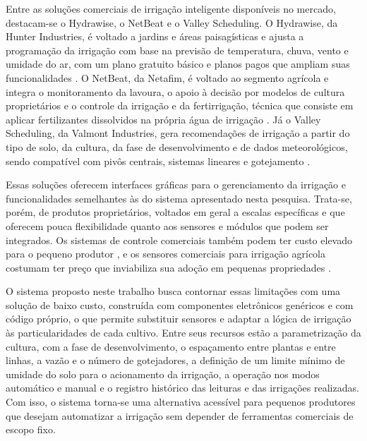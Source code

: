 Entre as soluções comerciais de irrigação inteligente disponíveis no mercado, destacam-se o Hydrawise, o NetBeat e o Valley Scheduling. O Hydrawise, da Hunter Industries, é voltado a jardins e áreas paisagísticas e ajusta a programação da irrigação com base na previsão de temperatura, chuva, vento e umidade do ar, com um plano gratuito básico e planos pagos que ampliam suas funcionalidades \cite{hunterhydrawise}. O NetBeat, da Netafim, é voltado ao segmento agrícola e integra o monitoramento da lavoura, o apoio à decisão por modelos de cultura proprietários e o controle da irrigação e da fertirrigação, técnica que consiste em aplicar fertilizantes dissolvidos na própria água de irrigação \cite{israelagri2018netbeat}. Já o Valley Scheduling, da Valmont Industries, gera recomendações de irrigação a partir do tipo de solo, da cultura, da fase de desenvolvimento e de dados meteorológicos, sendo compatível com pivôs centrais, sistemas lineares e gotejamento \cite{valmont2018,valleyscheduling}.

Essas soluções oferecem interfaces gráficas para o gerenciamento da irrigação e funcionalidades semelhantes às do sistema apresentado nesta pesquisa. Trata-se, porém, de produtos proprietários, voltados em geral a escalas específicas e que oferecem pouca flexibilidade quanto aos sensores e módulos que podem ser integrados. Os sistemas de controle comerciais também podem ter custo elevado para o pequeno produtor \cite{campos2021}, e os sensores comerciais para irrigação agrícola costumam ter preço que inviabiliza sua adoção em pequenas propriedades \cite{garcia2020iot}.

O sistema proposto neste trabalho busca contornar essas limitações com uma solução de baixo custo, construída com componentes eletrônicos genéricos e com código próprio, o que permite substituir sensores e adaptar a lógica de irrigação às particularidades de cada cultivo. Entre seus recursos estão a parametrização da cultura, com a fase de desenvolvimento, o espaçamento entre plantas e entre linhas, a vazão e o número de gotejadores, a definição de um limite mínimo de umidade do solo para o acionamento da irrigação, a operação nos modos automático e manual e o registro histórico das leituras e das irrigações realizadas. Com isso, o sistema torna-se uma alternativa acessível para pequenos produtores que desejam automatizar a irrigação sem depender de ferramentas comerciais de escopo fixo.


